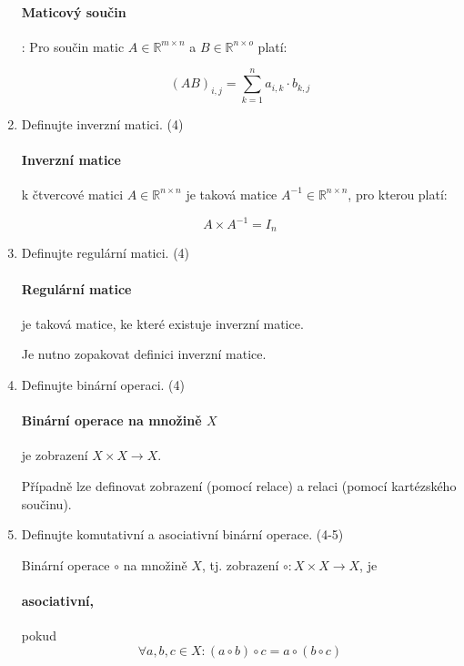 \documentclass[10pt,a4paper]{article}
\begin{document}
\begin{enumerate}
\paragraph{Maticový součin}: Pro součin matic $A \in \mathbb{R}^{m \times n}$ a $B \in \mathbb{R}^{n \times o}$ platí:

\begin{equation*}
(AB)_{i,j} = \displaystyle \sum_{k = 1}^n a_{i,k} \cdot b_{k,j}
\end{equation*}

\item Definujte inverzní matici. (4)

\paragraph{Inverzní matice} k čtvercové matici $A \in \mathbb{R}^{n \times n}$  je taková matice $A^{-1} \in \mathbb{R}^{n \times n}$, pro kterou platí:

\begin{equation*}
A \times A^{-1} = I_n 
\end{equation*}
 
\item Definujte regulární matici. (4)

\paragraph{Regulární matice} je taková matice, ke které existuje inverzní matice.

Je nutno zopakovat definici inverzní matice.

\item Definujte binární operaci. (4)

\paragraph{Binární operace na množině $X$} je zobrazení $X \times X \to X$. 

Případně lze definovat zobrazení (pomocí relace) a relaci (pomocí kartézského součinu).

\item Definujte komutativní a asociativní binární operace. (4-5)

Binární operace $\circ$ na množině $X$, tj. zobrazení $\circ: X \times X \to X$, je


\paragraph{asociativní,} pokud 
\begin{equation*}
\forall a,b,c \in X: (a \circ b) \circ c = a \circ (b \circ c)
\end{equation*}


\end{enumerate}
\end{document}
